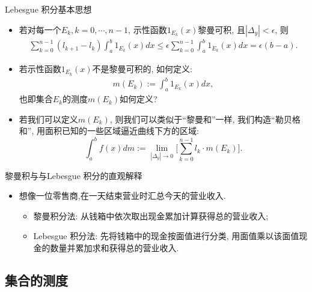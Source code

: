 \begin{frame}{{\rm Lebesgue} 积分基本思想}

	\begin{itemize}[<+-|alert@+>]

		\item  若对每一个$E_k, k=0, \cdots, n-1$, 示性函数$1_{E_k}(x)$黎曼可积, 且$|\Delta_y|<\epsilon$, 则
		\begin{align*}
			\sum_{k=0}^{n-1}(l_{k+1}-l_k)\int_{a}^{b} 1_{E_k}(x)dx\leq \epsilon \sum_{k=0}^{n-1}\int_{a}^{b}1_{E_k}(x)dx=\epsilon (b-a).
		\end{align*}


		\item  若示性函数$1_{E_k}(x)$不是黎曼可积的,  如何定义:
		\begin{align*}
			m(E_k):=\int_{a}^{b}1_{E_k}(x)dx,
		\end{align*}
		也即集合$E_k$的测度$m(E_k)$如何定义?


		\item 若我们可以定义$m(E_k)$, 则我们可以类似于“黎曼和”一样, 我们构造“勒贝格和”, 用面积已知的一些区域逼近曲线下方的区域:
		\[\int_a^bf(x)dm:=\lim_{|\Delta_y|\rightarrow 0}\Big[\sum_{k=0}^{n-1}l_k\cdot m(E_k)\Big].\]
	\end{itemize}

\end{frame}
\begin{frame}{黎曼积与与{\rm Lebesgue} 积分的直观解释}

	\begin{itemize}[<+-|alert@+>]%
		\item 想像一位零售商,在一天结束营业时汇总今天的营业收入.
		\begin{itemize}
			\item 黎曼积分法: 从钱箱中依次取出现金累加计算获得总的营业收入;
			\item{\rm Lebesgue} 积分法: 先将钱箱中的现金按面值进行分类, 用面值乘以该面值现金的数量并累加求和获得总的营业收入.
		\end{itemize}
	\end{itemize}

\end{frame}




\subsection{集合的测度}

